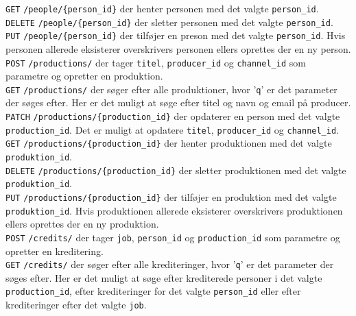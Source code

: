 \texttt{GET} \texttt{/people/\{person\_id\}} der henter personen med det valgte \texttt{person\_id}.\\


\texttt{DELETE} \texttt{/people/\{person\_id\}} der sletter personen med det valgte \texttt{person\_id}.\\


\texttt{PUT} \texttt{/people/\{person\_id\}} der tilføjer en preson med det valgte \texttt{person\_id}. Hvis personen allerede eksisterer overskrivers personen ellers oprettes der en ny person.\\

\texttt{POST} \texttt{/productions/} der tager \texttt{titel}, \texttt{producer\_id} og \texttt{channel\_id} som parametre og opretter en produktion.\\


\texttt{GET} \texttt{/productions/} der søger efter alle produktioner, hvor '\texttt{q}' er det parameter der søges efter. Her er det muligt at søge efter titel og navn og email på producer.\\


\texttt{PATCH} \texttt{/productions/\{production\_id\}} der opdaterer en person med det valgte \texttt{production\_id}. Det er muligt at opdatere \texttt{titel}, \texttt{producer\_id} og \texttt{channel\_id}.\\


\texttt{GET} \texttt{/productions/\{production\_id\}} der henter produktionen med det valgte \texttt{produktion\_id}.\\


\texttt{DELETE} \texttt{/productions/\{production\_id\}} der sletter produktionen med det valgte \texttt{produktion\_id}.\\


\texttt{PUT} \texttt{/productions/\{production\_id\}} der tilføjer en produktion med det valgte \texttt{produktion\_id}. Hvis produktionen allerede eksisterer overskrivers produktionen ellers oprettes der en ny produktion.\\


\texttt{POST} \texttt{/credits/} der tager \texttt{job}, \texttt{person\_id} og \texttt{production\_id} som parametre og opretter en kreditering.\\


\texttt{GET} \texttt{/credits/} der søger efter alle krediteringer, hvor '\texttt{q}' er det parameter der søges efter. Her er det muligt at søge efter krediterede personer i det valgte \texttt{production\_id}, efter krediteringer for det valgte \texttt{person\_id} eller efter krediteringer efter det valgte \texttt{job}.\\


